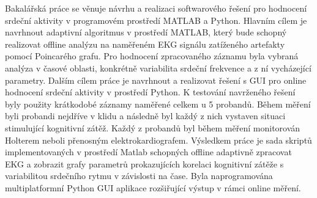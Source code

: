 Bakalářská práce se věnuje návrhu a realizaci softwarového řešení pro hodnocení
srdeční aktivity v programovém prostředí MATLAB a Python. Hlavním cílem je
navrhnout adaptivní algoritmus v prostředí MATLAB, který bude schopný realizovat
offline analýzu na naměřeném EKG signálu zatíženého artefakty pomocí Poincarého
grafu. Pro hodnocení zpracovaného záznamu byla vybraná analýza v časové oblasti,
konkrétně variabilita srdeční frekvence a z ní vycházející parametry. Dalším
cílem práce je navrhnout a realizovat řešení s GUI pro online hodnocení srdeční
aktivity v prostředí Python. K testování navrženého řešení byly použity
krátkodobé záznamy naměřené celkem u 5 probandů. Během měření byli probandi
nejdříve v klidu a následně byl každý z nich vystaven situaci stimulující
kognitivní zátěž. Každý z probandů byl během měření monitorován Holterem neboli
přenosným elektrokardiografem. Výsledkem práce je sada skriptů implementovaných
v prostředí Matlab schopných offline adaptivně zpracovat EKG a zobrazit grafy
parametrů prokazujících korelaci kognitivní zátěže s variabilitou srdečního
rytmu v závislosti na čase. Byla naprogramována multiplatformní Python GUI
aplikace rozšiřující výstup v rámci online měření. 

